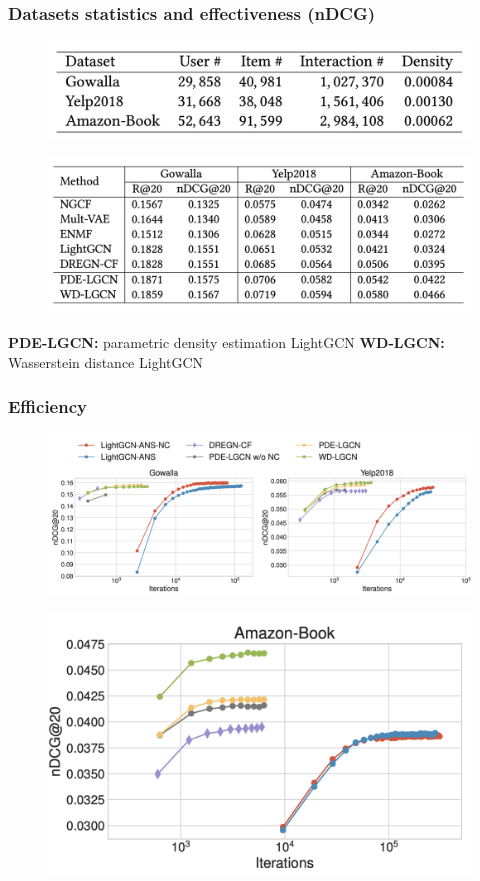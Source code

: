\documentclass{beamer}
\begin{document}
\begin{frame}
\frametitle{Datasets statistics and effectiveness (nDCG)}
\begin{figure}[h] 
\includegraphics[width=0.85 \textwidth]{datasets} 
\end{figure} \pause

\begin{figure}[h] 
\includegraphics[width=1 \textwidth]{nDCG} 
\end{figure} \vspace{-2mm}
{\tiny{{\bf PDE-LGCN:} parametric density estimation LightGCN  \hspace{5mm}  {\bf WD-LGCN:} Wasserstein distance LightGCN}}
\end{frame}


\begin{frame}
\frametitle{Efficiency} \vspace{-2mm}
\begin{figure}[h] 
\includegraphics[width=1 \textwidth]{runtime1} 
\end{figure} \vspace{-5mm}

\begin{figure}[h] 
\includegraphics[width=0.5 \textwidth]{runtime2}
\end{figure} 
\end{frame}
\end{document}
